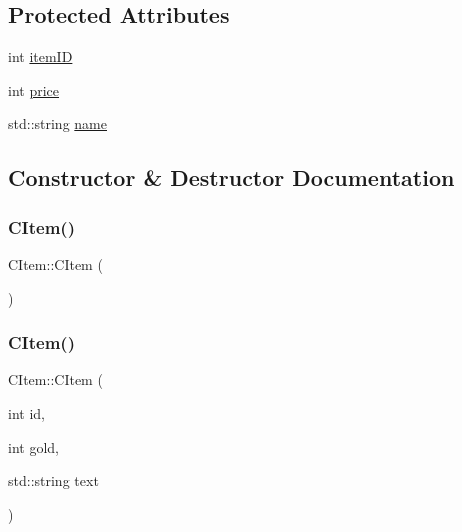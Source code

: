 \subsection*{Protected Attributes}
\begin{DoxyCompactItemize}
\item 
int \mbox{\hyperlink{class_c_item_a2a55ac7539e4dbdb30195078f5872bb2}{item\+ID}}
\item 
int \mbox{\hyperlink{class_c_item_ad2512107bbbb688e9141a5d5ea6d47de}{price}}
\item 
std\+::string \mbox{\hyperlink{class_c_item_a4d8b073203d9d09291e0fd07f4bcc479}{name}}
\end{DoxyCompactItemize}


\subsection{Constructor \& Destructor Documentation}
\mbox{\label{class_c_item_a07fbfc14fe69f3c3eca8670d0fe7a2f9}} 
\subsubsection{\texorpdfstring{C\+Item()}{CItem()}\hspace{0.1cm}{\footnotesize\ttfamily [1/2]}}
{\footnotesize\ttfamily C\+Item\+::\+C\+Item (\begin{DoxyParamCaption}{ }\end{DoxyParamCaption})\hspace{0.3cm}{\ttfamily [default]}}

\mbox{\label{class_c_item_ac17c22215b33dd4c108ef145b6eccdb3}} 
\subsubsection{\texorpdfstring{C\+Item()}{CItem()}\hspace{0.1cm}{\footnotesize\ttfamily [2/2]}}
{\footnotesize\ttfamily C\+Item\+::\+C\+Item (\begin{DoxyParamCaption}\item[{int}]{id,  }\item[{int}]{gold,  }\item[{std\+::string}]{text }\end{DoxyParamCaption})\hspace{0.3cm}{\ttfamily [inline]}}

